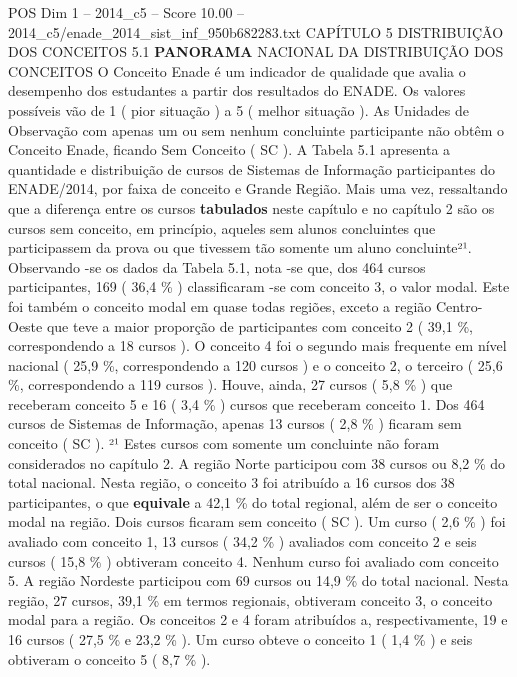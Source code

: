 \begin{textsample}{POS Dim 1 – 2014\_c5 – Score 10.00 – 2014\_c5/enade\_2014\_sist\_inf\_950b682283.txt}  \label{ex:f1_pos_103}
CAPÍTULO 5 DISTRIBUIÇÃO DOS CONCEITOS 5.1 \textbf{PANORAMA} NACIONAL DA DISTRIBUIÇÃO DOS CONCEITOS O Conceito Enade é um indicador de qualidade que avalia o desempenho dos estudantes a partir dos resultados do ENADE.
Os valores possíveis vão de 1 ( pior situação ) a 5 ( melhor situação ).
As Unidades de Observação com apenas um ou sem nenhum concluinte participante não obtêm o Conceito Enade, ficando Sem Conceito ( SC ).
A Tabela 5.1 apresenta a quantidade e distribuição de cursos de Sistemas de Informação participantes do ENADE/2014, por faixa de conceito e Grande Região.
Mais uma vez, ressaltando que a diferença entre os cursos \textbf{tabulados} neste capítulo e no capítulo 2 são os cursos sem conceito, em princípio, aqueles sem alunos concluintes que participassem da prova ou que tivessem tão somente um aluno concluinte²¹.
Observando -se os dados da Tabela 5.1, nota -se que, dos 464 cursos participantes, 169 ( 36,4 \% ) classificaram -se com conceito 3, o valor modal.
Este foi também o conceito modal em quase todas regiões, exceto a região Centro-Oeste que teve a maior proporção de participantes com conceito 2 ( 39,1 \%, correspondendo a 18 cursos ).
O conceito 4 foi o segundo mais frequente em nível nacional ( 25,9 \%, correspondendo a 120 cursos ) e o conceito 2, o terceiro ( 25,6 \%, correspondendo a 119 cursos ).
Houve, ainda, 27 cursos ( 5,8 \% ) que receberam conceito 5 e 16 ( 3,4 \% ) cursos que receberam conceito 1.
Dos 464 cursos de Sistemas de Informação, apenas 13 cursos ( 2,8 \% ) ficaram sem conceito ( SC ). ²¹ Estes cursos com somente um concluinte não foram considerados no capítulo 2.
A região Norte participou com 38 cursos ou 8,2 \% do total nacional.
Nesta região, o conceito 3 foi atribuído a 16 cursos dos 38 participantes, o que \textbf{equivale} a 42,1 \% do total regional, além de ser o conceito modal na região.
Dois cursos ficaram sem conceito ( SC ).
Um curso ( 2,6 \% ) foi avaliado com conceito 1, 13 cursos ( 34,2 \% ) avaliados com conceito 2 e seis cursos ( 15,8 \% ) obtiveram conceito 4.
Nenhum curso foi avaliado com conceito 5.
A região Nordeste participou com 69 cursos ou 14,9 \% do total nacional.
Nesta região, 27 cursos, 39,1 \% em termos regionais, obtiveram conceito 3, o conceito modal para a região.
Os conceitos 2 e 4 foram atribuídos a, respectivamente, 19 e 16 cursos ( 27,5 \% e 23,2 \% ).
Um curso obteve o conceito 1 ( 1,4 \% ) e seis obtiveram o conceito 5 ( 8,7 \% ).

\end{textsample}
